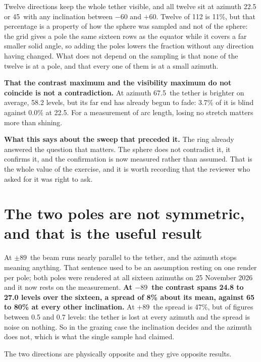 \FloatBarrier

Twelve directions keep the whole tether visible, and all twelve sit at
azimuth 22.5 or 45\textdegree\ with any inclination between $-60$ and
$+60$\textdegree. Twelve of 112 is 11\%, but that percentage is a property of
how the sphere was sampled and not of the sphere: the grid gives a pole the
same sixteen rows as the equator while it covers a far smaller solid angle,
so adding the poles lowers the fraction without any direction having
changed. What does not depend on the sampling is that none of the twelve is
at a pole, and that every one of them is at a small azimuth.

\textbf{That the contrast maximum and the visibility maximum do not coincide
is not a contradiction.} At azimuth 67.5\textdegree\ the tether is brighter
on average, 58.2 levels, but its far end has already begun to fade: 3.7\% of
it is blind against 0.0\% at 22.5\textdegree. For a measurement of arc
length, losing no stretch matters more than shining.

\textbf{What this says about the sweep that preceded it.} The ring already
answered the question that matters. The sphere does not contradict it, it
confirms it, and the confirmation is now measured rather than assumed. That
is the whole value of the exercise, and it is worth recording that the
reviewer who asked for it was right to ask.

\section{The two poles are not symmetric, and that is the useful result}

\label{sec:sun-poles}

At $\pm 89$\textdegree\ the beam runs nearly parallel to the tether, and the
azimuth stops meaning anything. That sentence used to be an assumption
resting on one render per pole; both poles were rendered at all sixteen
azimuths on 25 November 2026 and it now rests on the measurement.
\textbf{At $-89$\textdegree\ the contrast spans 24.8 to 27.0 levels over the
sixteen, a spread of 8\% about its mean, against 65 to 80\% at every other
inclination.} At $+89$\textdegree\ the spread is 47\%, but of figures between
0.5 and 0.7 levels: the tether is lost at every azimuth and the spread is
noise on nothing. So in the grazing case the inclination decides and the
azimuth does not, which is what the single sample had claimed.

The two directions are physically opposite and they give opposite results.


